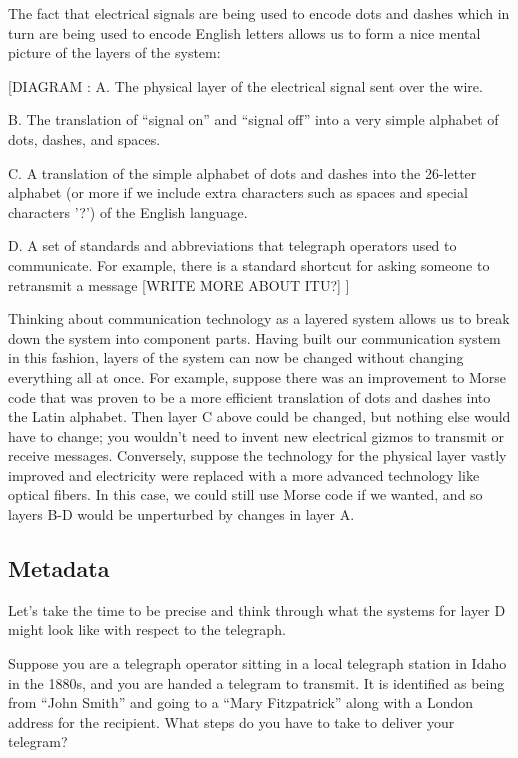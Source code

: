 \documentclass{book}
\begin{document}
The fact that electrical signals are being used to encode dots and dashes which in turn are being used to encode English letters allows us to form a nice mental picture of the layers of the system:

[DIAGRAM :
A. The physical layer of the electrical signal sent over the wire.

B. The translation of “signal on” and “signal off” into a very simple alphabet of dots, dashes, and spaces.

C. A translation of the simple alphabet of dots and dashes into the 26-letter alphabet (or more if we include extra characters such as spaces and special characters '?') of the English language.

D. A set of standards and abbreviations that telegraph operators used to communicate. For example, there is a standard shortcut for asking someone to retransmit a message [WRITE MORE ABOUT ITU?]
]

Thinking about communication technology as a layered system allows us to break down the system into component parts. Having built our communication system in this fashion, layers of the system can now be changed without changing everything all at once. For example, suppose there was an improvement to Morse code that was proven to be a more efficient translation of dots and dashes into the Latin alphabet. Then layer C above could be changed, but nothing else would have to change; you wouldn't need to invent new electrical gizmos to transmit or receive messages. Conversely, suppose the technology for the physical layer vastly improved and electricity were replaced with a more advanced technology like optical fibers. In this case, we could still use Morse code if we wanted, and so layers B-D would be unperturbed by changes in layer A.

\subsection{Metadata}

Let's take the time to be precise and think through what the systems for layer D might look like with respect to the telegraph.

Suppose you are a telegraph operator sitting in a local telegraph station in Idaho in the 1880s, and you are handed a telegram to transmit. It is identified as being from ``John Smith'' and going to a ``Mary Fitzpatrick'' along with a London address for the recipient. What steps do you have to take to deliver your telegram?
\end{document}
